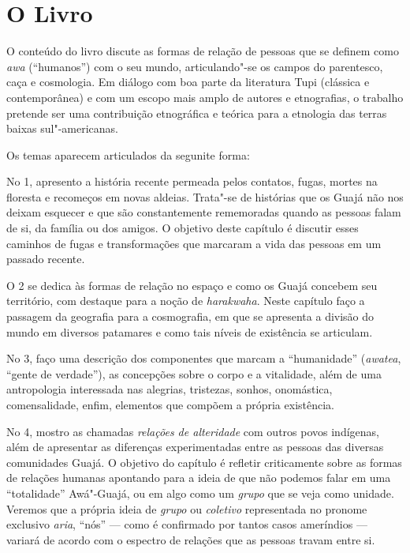 \section{O Livro}

O conteúdo do livro discute as formas de relação de pessoas que se
definem como \emph{awa} (``humanos'') com o seu mundo, articulando"-se os
campos do parentesco, caça e cosmologia. Em diálogo com boa parte da
literatura Tupi (clássica e contemporânea) e com um escopo mais amplo de
autores e etnografias, o trabalho pretende ser uma contribuição
etnográfica e teórica para a etnologia das terras baixas sul"-americanas.

Os temas aparecem articulados da segunite forma:

No  1, apresento a história recente permeada pelos
contatos, fugas, mortes na floresta e recomeços em novas aldeias.
Trata"-se de histórias que os Guajá não nos deixam esquecer e que são
constantemente rememoradas quando as pessoas falam de si, da família ou
dos amigos. O objetivo deste capítulo é discutir esses caminhos de fugas
e transformações que marcaram a vida das pessoas em um passado recente.

O  2 se dedica às formas de relação no espaço e como os
Guajá concebem seu território, com destaque para a noção de
\emph{harakwaha}. Neste capítulo faço a passagem da geografia para a
cosmografia, em que se apresenta a divisão do mundo em diversos
patamares e como tais níveis de existência se articulam.

No  3, faço uma descrição dos componentes que marcam a
``humanidade'' (\emph{awatea}, ``gente de verdade''), as concepções sobre
o corpo e a vitalidade, além de uma antropologia interessada nas
alegrias, tristezas, sonhos, onomástica, comensalidade, enfim, elementos
que compõem a própria existência.

No  4, mostro as chamadas \emph{relações de alteridade}
com outros povos indígenas, além de apresentar as diferenças
experimentadas entre as pessoas das diversas comunidades Guajá. O
objetivo do capítulo é refletir criticamente sobre as formas de relações
humanas apontando para a ideia de que não podemos falar em uma
``totalidade'' Awá"-Guajá, ou em algo como um \emph{grupo} que se veja
como unidade. Veremos que a própria ideia de \emph{grupo} ou
\emph{coletivo} representada no pronome exclusivo \emph{aria}, ``nós'' ---
como é confirmado por tantos casos ameríndios --- variará de acordo com o
espectro de relações que as pessoas travam entre si.

